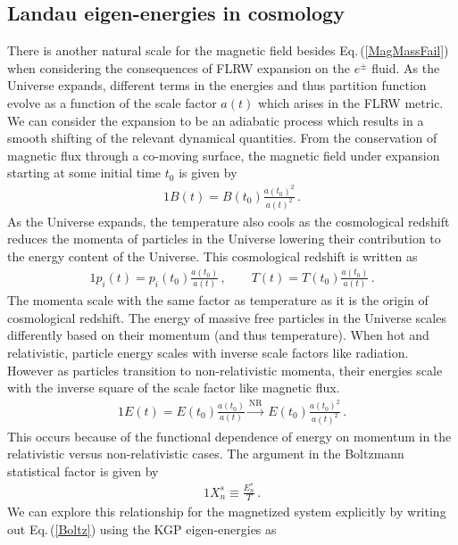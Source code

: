 \documentclass[universe,article,submit,moreauthors,pdftex,a4paper]{Definitions/mdpi}
\newcommand{\req}[1]{Eq.\,(\ref{#1})}
\begin{document}
\subsection{Landau eigen-energies in cosmology}\label{sec:Landau}
\noindent There is another natural scale for the magnetic field besides \req{MagMassFail} when considering the consequences of FLRW expansion on the $e^{\pm}$ fluid. As the Universe expands, different terms in the energies and thus partition function evolve as a function of the scale factor $a(t)$ which arises in the FLRW metric. We can consider the expansion to be an adiabatic process which results in a smooth shifting of the relevant dynamical quantities. From the conservation of magnetic flux through a co-moving surface, the magnetic field under expansion starting at some initial time $t_{0}$ is given by
\begin{alignat}{1}
    \label{BScale} B(t) = B(t_{0})\frac{a(t_{0})^{2}}{a(t)^{2}}\,.
\end{alignat}
As the Universe expands, the temperature also cools as the cosmological redshift reduces the momenta of particles in the Universe lowering their contribution to the energy content of the Universe. This cosmological redshift is written as
\begin{alignat}{1}
  \label{Redshift} p_{i}(t) = p_{i}(t_{0})\frac{a(t_{0})}{a(t)}\,,\qquad T(t) = T(t_{0})\frac{a(t_{0})}{a(t)}\,.
\end{alignat}
The momenta scale with the same factor as temperature as it is the origin of cosmological redshift. The energy of massive free particles in the Universe scales differently based on their momentum (and thus temperature). When hot and relativistic, particle energy scales with inverse scale factors like radiation. However as particles transition to non-relativistic momenta, their energies scale with the inverse square of the scale factor like magnetic flux.
\begin{alignat}{1}
    \label{EScale} E(t) = E(t_{0})\frac{a(t_{0})}{a(t)}\xrightarrow{\mathrm{NR}}\  E(t_{0})\frac{a(t_{0})^{2}}{a(t)^{2}}\,.
\end{alignat}
This occurs because of the functional dependence of energy on momentum in the relativistic versus non-relativistic cases. The argument in the Boltzmann statistical factor is given by
\begin{alignat}{1}
    \label{Boltz} X_{n}^{s}\equiv\frac{E_{n}^{s}}{T}\,.
\end{alignat}
We can explore this relationship for the magnetized system explicitly by writing out \req{Boltz} using the KGP eigen-energies as
\end{document}
